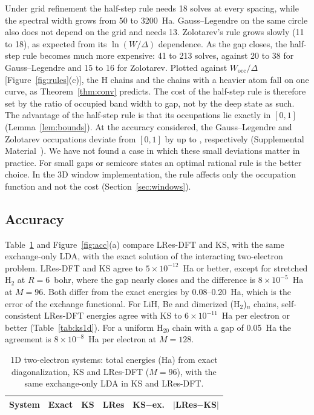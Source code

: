 \documentclass[aps,prb,twocolumn,superscriptaddress,floatfix,longbibliography]{revtex4-2}
\theoremstyle{remark}
\newcommand{\SM}{Supplemental Material~\cite{SM}}
\begin{document}
Under grid refinement the half-step rule needs 18 solves at every spacing, while the spectral width grows from 50 to
3200~Ha. Gauss--Legendre on the same circle also does not depend on the grid and needs 13. Zolotarev's rule grows slowly
(11 to 18), as expected from its $\ln(W/\Delta)$ dependence. As the gap closes, the half-step rule becomes much more
expensive: 41 to 213 solves, against 20 to 38 for Gauss--Legendre and 15 to 16 for Zolotarev. Plotted against
$W_\mathrm{occ}/\Delta$ [Figure~\ref{fig:rules}(c)], the H chains and the chains with a heavier atom fall on one curve, as
Theorem~\ref{thm:conv} predicts. The cost of the half-step rule is therefore set by the ratio of occupied band width to gap,
not by the deep state as such. The advantage of the half-step rule is that its occupations lie exactly in $[0,1]$
(Lemma~\ref{lem:bounds}). At the accuracy considered, the Gauss--Legendre and Zolotarev occupations deviate from $[0,1]$ by
up to , respectively (\SM). We have not found a case in which these small deviations matter
in practice. For small gaps or semicore states an optimal rational rule is the better choice. In the 3D window
implementation, the rule affects only the occupation function and not the cost (Section~\ref{sec:windows}).

\subsection{Accuracy}

Table~\ref{tab:exact} and Figure~\ref{fig:acc}(a) compare LRes-DFT and KS, with the same exchange-only LDA, with the exact
solution of the interacting two-electron problem. LRes-DFT and KS agree to $5\times10^{-12}$~Ha or better, except for
stretched H$_2$ at $R=6$~bohr, where the gap nearly closes and the difference is $8\times10^{-5}$~Ha at $M=96$. Both
differ from the exact energies by 0.08--0.20~Ha, which is the error of the exchange functional. For LiH, Be and
dimerized (H$_2$)$_n$ chains, self-consistent LRes-DFT energies agree with KS to $6\times10^{-11}$~Ha per electron or better
(Table~\ref{tab:ks1d}). For a uniform H$_{20}$ chain with a gap of 0.05~Ha the agreement is $8\times10^{-8}$~Ha per
electron at $M=128$.

\begin{table}[t]
\caption{\label{tab:exact}
1D two-electron systems: total energies (Ha) from exact diagonalization, KS and LRes-DFT ($M=96$), with the same
exchange-only LDA in KS and LRes-DFT.}
\begin{ruledtabular}
\footnotesize\setlength{\tabcolsep}{2pt}
\begin{tabular}{lccccc}
System & Exact & KS & LRes & KS$-$ex. & $|$LRes$-$KS$|$ \\
\hline

\end{tabular}
\end{ruledtabular}
\end{table}
\end{document}
